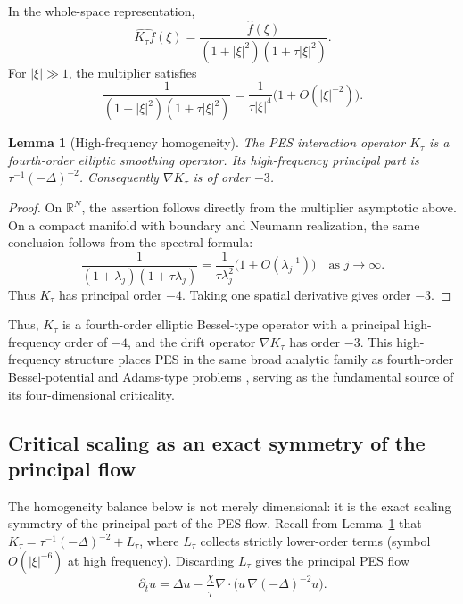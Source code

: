 \documentclass[pdflatex,sn-mathphys-num]{sn-jnl}%
\theoremstyle{thmstyleone}
\newtheorem{lemma}[theorem]{Lemma}
\theoremstyle{thmstyletwo}
\theoremstyle{thmstylethree}
\begin{document}
In the whole-space representation,
\[
        \widehat{K_\tau f}(\xi)
        =
        \frac{\widehat f(\xi)}
        {(1+|\xi|^2)(1+\tau|\xi|^2)}.
\]
For \(|\xi|\gg1\), the multiplier satisfies
\[
        \frac{1}{(1+|\xi|^2)(1+\tau|\xi|^2)}
        =
        \frac{1}{\tau|\xi|^4}\bigl(1+O(|\xi|^{-2})\bigr).
\]
\begin{lemma}[High-frequency homogeneity]
\label{lem:high-frequency-homogeneity}
The PES interaction operator \(K_\tau\) is a fourth-order elliptic smoothing
operator.  Its high-frequency principal part is \(\tau^{-1}(-\Delta)^{-2}\).
Consequently \(\nabla K_\tau\) is of order \(-3\).
\end{lemma}

\begin{proof}
On \(\mathbb R^N\), the assertion follows directly from the multiplier
asymptotic above.  On a compact manifold with boundary and Neumann realization,
the same conclusion follows from the spectral formula:
\[
        \frac{1}{(1+\lambda_j)(1+\tau\lambda_j)}
        =
        \frac{1}{\tau\lambda_j^2}\bigl(1+O(\lambda_j^{-1})\bigr)
        \quad\text{as }j\to\infty .
\]
Thus \(K_\tau\) has principal order \(-4\).  Taking one spatial derivative gives
order \(-3\).
\end{proof}

Thus, \(K_\tau\) is a fourth-order elliptic Bessel-type operator with a principal high-frequency order of \(-4\), and the drift operator \(\nabla K_\tau\) has order \(-3\). This high-frequency structure places PES in the same broad analytic family as fourth-order Bessel-potential and Adams-type problems \cite{adams1988sharp,adams2003sobolev,stein1970singular,triebel1995interpolation}, serving as the fundamental source of its four-dimensional criticality.

\subsection{Critical scaling as an exact symmetry of the principal flow}
\label{subsec:exact-scaling}
The homogeneity balance below is not merely dimensional: it is the exact
scaling symmetry of the principal part of the PES flow. Recall from
Lemma~\ref{lem:high-frequency-homogeneity} that
\(K_\tau=\tau^{-1}(-\Delta)^{-2}+L_\tau\), where \(L_\tau\) collects strictly
lower-order terms (symbol \(O(|\xi|^{-6})\) at high frequency). Discarding
\(L_\tau\) gives the principal PES flow
\begin{equation}
\label{eq:principal-PES}
        \partial_t u=\Delta u-\frac{\chi}{\tau}
        \nabla\!\cdot\!\bigl(u\,\nabla(-\Delta)^{-2}u\bigr).
\end{equation}
\end{document}
